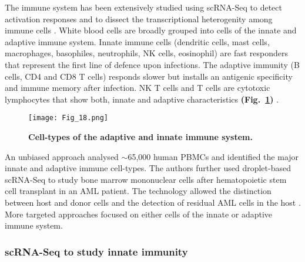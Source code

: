 The immune system has been extensively studied using scRNA-Seq to detect activation responses and to dissect the transcriptional heterogenity among immune cells \citep{Proserpio2015, Satija2014}. White blood cells are broadly grouped into cells of the innate and adaptive immune system. Innate immune cells (dendritic cells, mast cells, macrophages, basophiles, neutrophils, \gls{NK} cells, eosinophil) are fast responders that represent the first line of defence upon infections. The adaptive immunity (B cells, CD4\plus{} and CD8\plus{} T cells) responds slower but installs an antigenic specificity and immune memory after infection. \gls{NK} T cells and \textgamma{}\textdelta{} T cells are cytotoxic lymphocytes that show both, innate and adaptive characteristics \textbf{(Fig.~\ref{fig0:immune_system})} \citep{Dranoff2004}. 

\begin{figure}[!h]
\centering
\texttt{[image: Fig\_18.png]}
\caption[Cell-types of the adaptive and innate immune system]{\textbf{Cell-types of the adaptive and innate immune system.}}
\label{fig0:immune_system}
\end{figure}

An unbiased approach analysed $\sim$65,000 human \glspl{PBMC} and identified the major innate and adaptive immune cell-types. The authors further used droplet-based scRNA-Seq to study bone marrow mononuclear cells after hematopoietic stem cell transplant in an \gls{AML} patient. The technology allowed the distinction between host and donor cells and the detection of residual AML cells in the host \citep{Zheng2017}. \\

More targeted approaches focused on either cells of the innate or adaptive immune system.

\subsubsection{scRNA-Seq to study innate immunity}


